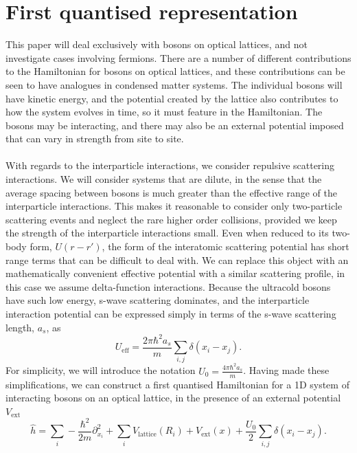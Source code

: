 \documentclass[a4paper,10pt]{article}
\begin{document}
\section{First quantised representation}
This paper will deal exclusively with bosons on optical lattices, and not investigate cases involving fermions.
There are a number of different contributions to the Hamiltonian for bosons on optical lattices, and these contributions can be seen to have analogues in condensed matter systems.
The individual bosons will have kinetic energy, and the potential created by the lattice also contributes to how the system evolves in time, so it must feature in the Hamiltonian.
The bosons may be interacting, and there may also be an external potential imposed that can vary in strength from site to site. 
\\\\
With regards to the interparticle interactions, we consider repulsive scattering interactions. We will consider systems that are dilute, in the sense that the average spacing between
bosons is much greater than the effective range of the interparticle interactions. This makes it reasonable to consider only two-particle scattering events and neglect the rare higher
order collisions, provided we keep the strength of the interparticle interactions small. Even when reduced to its two-body form, $U(r-r')$, the form of the 
interatomic scattering potential has short range terms that can be difficult to deal with. We can replace this object with an mathematically convenient effective potential with a similar scattering
profile, in this case we assume delta-function interactions. Because the ultracold bosons have such low 
energy, s-wave scattering dominates, and the interparticle interaction potential can be expressed simply in terms of the s-wave scattering length, $a_s$, as
\begin{equation}
 U_{\text{eff}}=\frac{2\pi\hbar^2a_s}{m}\sum_{i,j}\delta(x_{i}-x_{j}).
\end{equation}
For simplicity, we will introduce the notation $U_0=\frac{4\pi\hbar^2a_s}{m}$.
Having made these simplifications, we can construct a first quantised Hamiltonian for a 1D system of interacting bosons on an optical lattice, in the presence of an external potential $V_{\text{ext}}$
\begin{equation}
  \label{eq:HamiltonianCoordinateRepresentation}
 \hat{h}=\sum_{i}-\frac{\hbar^{2}}{2m}  \partial_{x_{i}}^2+\sum_{i}V_{\text{lattice}}(R_{i})+V_{\text{ext}}(x)+\frac{U_0}{2}\sum_{i,j}\delta(x_{i}-x_{j}).
\end{equation}
\end{document}
